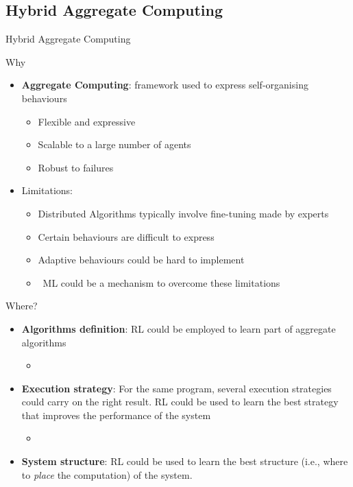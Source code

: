 \documentclass[presentation, 8pt]{beamer}\mode<presentation>{\usetheme{AMSBolognaFC}}
\begin{document}
\subsection{Hybrid Aggregate Computing}
\begin{frame}{Hybrid Aggregate Computing}
	\begin{alertblock}{Why}
		\begin{itemize}
			\item \textbf{Aggregate Computing}: framework used to express self-organising behaviours
			\begin{itemize}
				\item[\faThumbsUp] Flexible and expressive
				\item[\faThumbsUp] Scalable to a large number of agents
				\item[\faThumbsUp] Robust to failures
			\end{itemize}
			\item Limitations:
			\begin{itemize}
				\item Distributed Algorithms typically involve fine-tuning made by experts
				\item Certain behaviours are difficult to express
				\item Adaptive behaviours could be hard to implement
				\item \faArrowRight \, ML could be a mechanism to overcome these limitations
			\end{itemize}
		\end{itemize}
	\end{alertblock}
	\begin{alertblock}{Where?}
		\begin{itemize}
			\item \textbf{Algorithms definition}: RL could be employed to learn part of aggregate algorithms 
			\begin{itemize}
				\item[\faArrowRight] 
			\end{itemize}
			\item \textbf{Execution strategy}: For the same program, several execution strategies could carry on the right result. RL could be used to learn the best strategy that improves the performance of the system 
			\begin{itemize}
				\item[\faArrowRight] 
			\end{itemize}
			\item \textbf{System structure}: RL could be used to learn the best structure (i.e., where to \emph{place} the computation) of the system.
		\end{itemize}
	\end{alertblock}
\end{frame}
\end{document}
